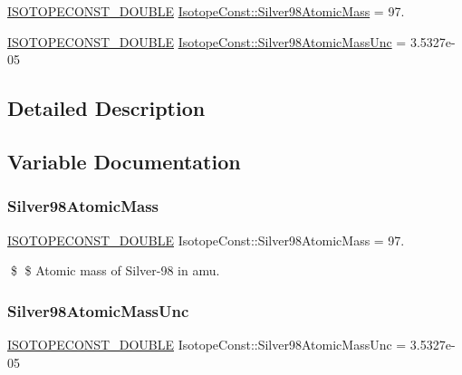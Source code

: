 \begin{DoxyCompactItemize}
\item 
\mbox{\hyperlink{group___isotope_const-_macros_ga8f45a7272ce02c0b4c65c44636ed719a}{I\+S\+O\+T\+O\+P\+E\+C\+O\+N\+S\+T\+\_\+\+D\+O\+U\+B\+LE}} \mbox{\hyperlink{group___isotope_const-_silver-_ag98_ga91117fc1713d3a8fcbbca59a2ceadf18}{Isotope\+Const\+::\+Silver98\+Atomic\+Mass}} = 97.
\item 
\mbox{\hyperlink{group___isotope_const-_macros_ga8f45a7272ce02c0b4c65c44636ed719a}{I\+S\+O\+T\+O\+P\+E\+C\+O\+N\+S\+T\+\_\+\+D\+O\+U\+B\+LE}} \mbox{\hyperlink{group___isotope_const-_silver-_ag98_ga15ef04cae784148439bfc72d380e3572}{Isotope\+Const\+::\+Silver98\+Atomic\+Mass\+Unc}} = 3.\+5327e-\/05
\end{DoxyCompactItemize}


\subsection{Detailed Description}


\subsection{Variable Documentation}
\mbox{\label{group___isotope_const-_silver-_ag98_ga91117fc1713d3a8fcbbca59a2ceadf18}} 
\subsubsection{\texorpdfstring{Silver98\+Atomic\+Mass}{Silver98AtomicMass}}
{\footnotesize\ttfamily \mbox{\hyperlink{group___isotope_const-_macros_ga8f45a7272ce02c0b4c65c44636ed719a}{I\+S\+O\+T\+O\+P\+E\+C\+O\+N\+S\+T\+\_\+\+D\+O\+U\+B\+LE}} Isotope\+Const\+::\+Silver98\+Atomic\+Mass = 97.}

\$ \$ Atomic mass of Silver-\/98 in amu. \mbox{\label{group___isotope_const-_silver-_ag98_ga15ef04cae784148439bfc72d380e3572}} 
\subsubsection{\texorpdfstring{Silver98\+Atomic\+Mass\+Unc}{Silver98AtomicMassUnc}}
{\footnotesize\ttfamily \mbox{\hyperlink{group___isotope_const-_macros_ga8f45a7272ce02c0b4c65c44636ed719a}{I\+S\+O\+T\+O\+P\+E\+C\+O\+N\+S\+T\+\_\+\+D\+O\+U\+B\+LE}} Isotope\+Const\+::\+Silver98\+Atomic\+Mass\+Unc = 3.\+5327e-\/05}

